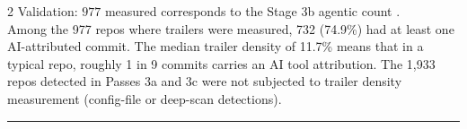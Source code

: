 \documentclass[10pt,a4paper]{article}
\begin{document}
\begin{multicols}{2}
\vspace{2pt}
{\small Validation: $977$ measured corresponds to the Stage 3b agentic count \checkmark.\\
Among the 977 repos where trailers were measured, 732 (74.9\%) had at least one
AI-attributed commit. The median trailer density of 11.7\% means that in a typical
repo, roughly 1 in 9 commits carries an AI tool attribution.
The 1,933 repos detected in Passes 3a and 3c were not subjected to trailer density
measurement (config-file or deep-scan detections).}

\end{multicols}

\vspace{6pt}
\hrule
\vspace{6pt}
\end{document}
